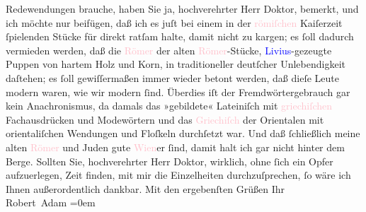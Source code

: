                     Redewendungen brauche, haben Sie ja, hochverehrter Herr Doktor, be{\pb}merkt, und ich möchte nur beifügen,
                    daß ich es juſt bei einem in der \textcolor{pink}{römiſchen}{}\ledrightnote{\textcolor{pink}{Rom}}
                    Kaiſerzeit ſpielenden Stücke für direkt ratſam halte, damit nicht zu kargen; es
                    ſoll dadurch vermieden werden, daß die \textcolor{pink}{Römer}{}\ledrightnote{\textcolor{pink}{Rom}}
                    der alten \textcolor{pink}{Römer}{}\ledrightnote{\textcolor{pink}{Rom}}-Stücke, \textcolor{blue}{Livius}{}\ledrightnote{\textcolor{blue}{Titus Livius}}-gezeugte Puppen von hartem Holz und Korn, in
                    traditioneller deutſcher Unlebendigkeit daſtehen; es ſoll gewiſſermaßen immer
                    wieder betont werden, daß dieſe Leute modern waren, wie wir modern ſind.
                    Überdies iſt der Fremdwörtergebrauch gar kein Anachronismus, da damals das
                    »gebildete« Lateiniſch mit \textcolor{pink}{griechiſchen}{}\ledrightnote{\textcolor{pink}{Griechenland}}
                    Fachausdrücken und Modewörtern und das \textcolor{pink}{Griechiſch}{}\ledrightnote{\textcolor{pink}{Griechenland}} der Orientalen mit orientaliſchen Wendungen und Floſkeln
                    durchſetzt war. Und daß ſchließlich meine alten \textcolor{pink}{Römer}{}\ledrightnote{\textcolor{pink}{Rom}} und Juden gute \textcolor{pink}{Wien}{}\ledrightnote{\textcolor{pink}{Wien}}er ſind,
                    damit halt ich gar nicht hinter dem Berge.\pend
           \pstart
           Sollten Sie, hochverehrter Herr Doktor, wirklich, ohne ſich ein Opfer
                    aufzuerlegen, Zeit finden, mit mir die Einzelheiten durchzuſprechen, ſo wäre ich
                    Ihnen außerordentlich dankbar.\pend
           \pstart
           Mit den ergebenſten Grüßen\pend
           \pstart
           Ihr{\\[\baselineskip]}\spacefill\mbox{Robert Adam}\pend
           \leftskip=0em{}\endnumbering{}  
      